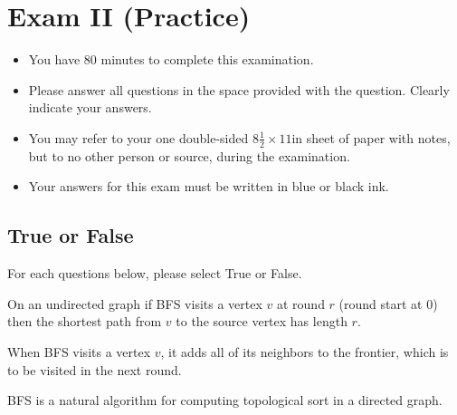 \chapter{Exam II (Practice)}
\label{ch:examii-practice}

\begin{preamble}
\begin{itemize}
\item You have 80 minutes to complete this examination.
\item Please answer all questions in the space provided with the
  question.  Clearly indicate your answers.
\item You may refer to your one double-sided $8\frac{1}{2} \times 11$in
  sheet of paper with notes, but to no other person or source, during the
  examination.

\item Your answers for this exam must be written in blue or black ink.

\end{itemize}
\end{preamble}


\section{True or False}

\begin{problem}[14.][BFS]
For each questions below, please select True or False.

\asktf

On an undirected graph if  BFS visits a vertex $v$ at round $r$ (round
start at $0$) then the shortest path from $v$ to the source vertex has
length $r$.

\solt

\asktf

When BFS visits a vertex $v$, it adds all of its neighbors to the
frontier, which is to be visited in the next round.

\solf

\asktf

BFS is a natural algorithm for computing topological sort in a directed graph.

\solf

\end{problem}

